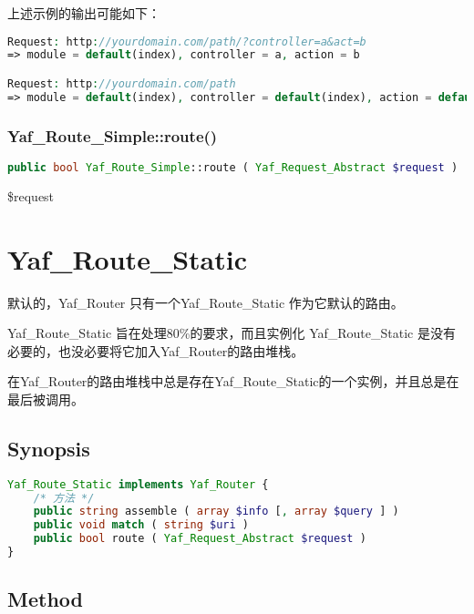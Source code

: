 上述示例的输出可能如下：

\begin{lstlisting}[language=PHP]
Request: http://yourdomain.com/path/?controller=a&act=b
=> module = default(index), controller = a, action = b

Request: http://yourdomain.com/path
=> module = default(index), controller = default(index), action = default(index)
\end{lstlisting}

\subsection{Yaf\_Route\_Simple::route()}



\begin{lstlisting}[language=PHP]
public bool Yaf_Route_Simple::route ( Yaf_Request_Abstract $request )
\end{lstlisting}

\begin{compactitem}
\item \$request
\end{compactitem}

\chapter{Yaf\_Route\_Static}

默认的，Yaf\_Router 只有一个Yaf\_Route\_Static 作为它默认的路由。

Yaf\_Route\_Static 旨在处理80\%的要求，而且实例化 Yaf\_Route\_Static 是没有必要的，也没必要将它加入Yaf\_Router的路由堆栈。

在Yaf\_Router的路由堆栈中总是存在Yaf\_Route\_Static的一个实例，并且总是在最后被调用。

\section{Synopsis}

\begin{lstlisting}[language=PHP]
Yaf_Route_Static implements Yaf_Router {
    /* 方法 */
    public string assemble ( array $info [, array $query ] )
    public void match ( string $uri )
    public bool route ( Yaf_Request_Abstract $request )
}
\end{lstlisting}

\section{Method}



